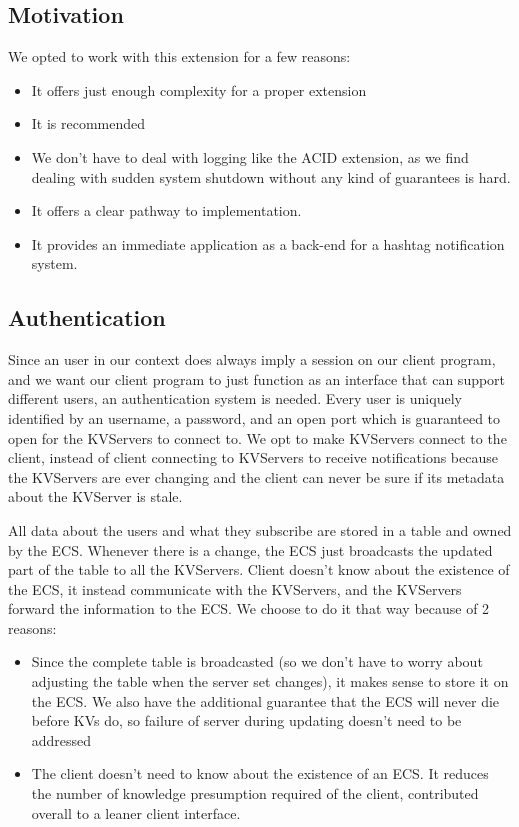 \documentclass[sigconf]{acmart}
\begin{document}
\subsection{Motivation}

We opted to work with this extension for a few reasons:

\begin{itemize}
	\item It offers just enough complexity for a proper extension
	\item It is recommended
	\item We don't have to deal with logging like the ACID extension, as we find dealing with sudden system shutdown without any kind of guarantees is hard.
	\item It offers a clear pathway to implementation. 
	\item It provides an immediate application as a back-end for a hashtag notification system.
\end{itemize}

\subsection{Authentication}

Since an user in our context does always imply a session on our client program, and we want our client program to just function as an interface that can support different users, an authentication system is needed. Every user is uniquely identified by an username, a password, and an open port which is guaranteed to open for the KVServers to connect to. We opt to make KVServers connect to the client, instead of client connecting to KVServers to receive notifications because the KVServers are ever changing and the client can never be sure if its metadata about the KVServer is stale.

All data about the users and what they subscribe are stored in a table and owned by the ECS. Whenever there is a change, the ECS just broadcasts the updated part of the table to all the KVServers. Client doesn't know about the existence of the ECS, it instead communicate with the KVServers, and the KVServers forward the information to the ECS. We choose to do it that way because of 2 reasons:
\begin{itemize}
	\item {Since the complete table is broadcasted (so we don't have to worry about adjusting the table when the server set changes), it makes sense to store it on the ECS. We also have the additional guarantee that the ECS will never die before KVs do, so failure of server during updating doesn't need to be addressed}
	\item {The client doesn't need to know about the existence of an ECS. It reduces the number of knowledge presumption required of the client, contributed overall to a leaner client interface.}
\end{itemize}
\end{document}
